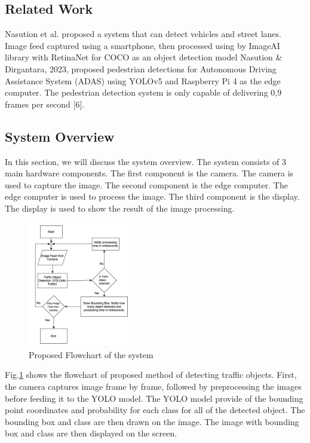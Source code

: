 \documentclass[conference]{IEEEtran}
\begin{document}
\subsection{Related Work}
Nasution et al.\cite{Road Information Collector} proposed a system that can detect vehicles and street lanes.
Image feed captured using a smartphone, then processed using by ImageAI library with RetinaNet for COCO as an object detection model 
Nasution \& Dirgantara, 2023, proposed pedestrian detections for Autonomous Driving Assistance System (ADAS) using YOLOv5 and Raspberry Pi 4 as the edge computer. The pedestrian detection system is only capable of delivering 0,9 frames per second [6].

\subsection{System Overview}
In this section, we will discuss the system overview. The system consists of 3 main hardware components. 
The first component is the camera. The camera is used to capture the image.
The second component is the edge computer. The edge computer is used to process the image. 
The third component is the display. The display is used to show the result of the image processing.
\begin{figure}[h]
\centering
\includegraphics[width=0.4\textwidth,keepaspectratio]{Proposed Flowchart.png}
\caption{Proposed Flowchart of the system}
\label{fig:flowchart}
\end{figure}



Fig.\ref{fig:flowchart} shows the flowchart of proposed method of detecting traffic objects. First, the camera captures image frame by frame, followed by preprocessing the images before feeding it to the YOLO model.
The YOLO model provide of the bounding point coordinates and probability for each class for all of the detected object. The bounding box and class are then drawn on the image. The image with bounding box and class are then displayed on the screen.
\end{document}
